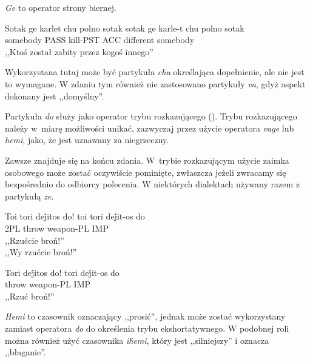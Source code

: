 \begin{spacing}{1.1}
\skipline

\emph{Ge} to operator strony biernej.

\begin{exe}
	\ex
	\trans Sotak ge karlet chu polno sotak
	\gll  sotak ge karle-t chu polno sotak\\
	  somebody PASS kill-PST ACC different somebody\\
	\glt  ,,Ktoś został zabity przez kogoś innego''
\end{exe}

Wykorzystana tutaj może być partykuła \emph{chu} określająca dopełnienie, ale
nie jest to wymagane. W zdaniu tym również nie zastosowano partykuły \emph{va},
gdyż aspekt dokonany jest ,,domyślny''.

Partykuła \emph{do} służy jako operator trybu rozkazującego (\Imp{}). Trybu
rozkazującego należy w~miarę możliwości unikać, zazwyczaj przez użycie operatora
\emph{vage} lub \emph{hemi}, jako, że jest uznawany za niegrzeczny.

Zawsze znajduje się na końcu zdania. W~trybie rozkazującym użycie zaimka
osobowego może zostać oczywiście pominięte, zwłaszcza jeżeli zwracamy się
bezpośrednio do odbiorcy polecenia. W niektórych dialektach używany razem z
partykułą \emph{ze}.

\begin{exe}
	\ex
	\trans Toi tori dej́itos do!
	\gll  toi tori dej́it-os do\\
	  2PL throw weapon-PL IMP\\
	\glt  ,,Rzućcie broń!'' \\ ,,Wy rzućcie broń!''
\end{exe}

\begin{exe}
	\ex
	\trans Tori dej́itos do!
	\gll  tori dej́it-os do\\
	  throw weapon-PL IMP\\
	\glt  ,,Rzuć broń!''
\end{exe}

\emph{Hemi} to czasownik oznaczający ,,prosić'', jednak może zostać wykorzystany
zamiast operatora \emph{do} do określenia trybu ekshortatywnego. W podobnej roli
można również użyć czasownika \emph{ih́emi}, który jest ,,silniejszy'' i oznacza
,,błaganie''.


\end{spacing}
